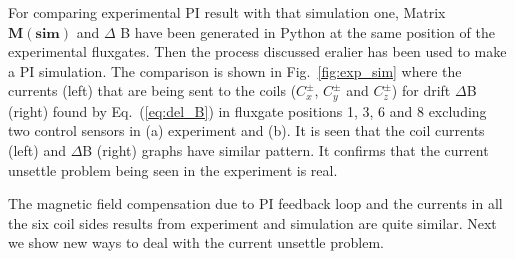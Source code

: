For comparing experimental PI result with that simulation one, Matrix $\bm{M(\text{sim})}$ and $\Delta$ B have been generated in Python at the same position of the experimental fluxgates. Then the process discussed eralier has been used to make a PI simulation. The comparison is shown in Fig.~\ref{fig:exp_sim} where the currents (left) that are being sent to the coils ($C_x^\pm$, $C_y^\pm$ and $C_z^\pm$) for drift $\Delta$B (right) found by Eq.~(\ref{eq:del_B}) in fluxgate positions 1, 3, 6 and 8 excluding two control sensors in (a) experiment and (b). It is seen that the coil currents (left) and $\Delta$B (right) graphs have similar pattern. It confirms that the current unsettle problem being seen in the experiment is real.




The magnetic field compensation due to PI feedback loop and the currents in all the six coil sides results from experiment and simulation are quite similar. Next we show new ways to deal with the current unsettle problem. 


